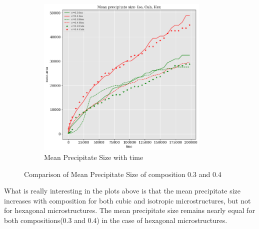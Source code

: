 \documentclass[12pt, a4paper]{report}
\begin{document}
\begin{figure}[H]
\centering
\begin{subfigure}{.7\textwidth}
  \centering
  \includegraphics[width=0.9\textwidth]{Pictures/images9/hexTime/meanSizeComparison.png}
  \caption{Mean Precipitate Size with time}
  \label{img:microstrImg}
\end{subfigure}
\caption{Comparison of Mean Precipitate Size of composition 0.3 and 0.4}
\label{fig:test22}
\end{figure}

What is really interesting in the plots above is that the mean precipitate size increases with composition for both cubic and isotropic microstructures, but not for hexagonal microstructures. The mean precipitate size remains nearly equal for both compositions(0.3 and 0.4) in the case of hexagonal microstructures. 

\end{document}
